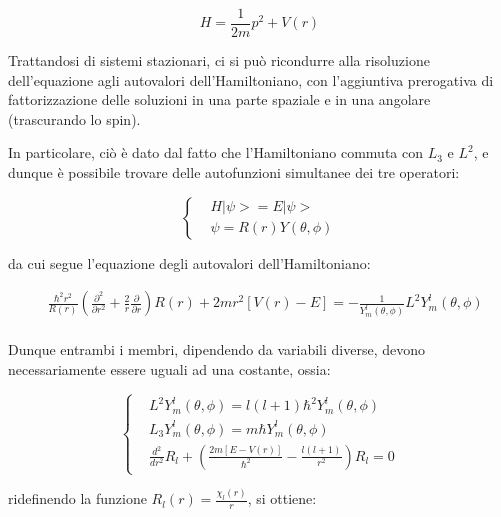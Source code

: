 \documentclass{article}
\begin{document}
\begin{equation}
    H=\frac{1}{2m}p^2+V(r)
\end{equation}

Trattandosi di sistemi stazionari, ci si può ricondurre alla risoluzione dell'equazione agli autovalori dell'Hamiltoniano,
con l'aggiuntiva prerogativa di fattorizzazione delle soluzioni in una parte spaziale e in una angolare (trascurando lo spin).

In particolare, ciò è dato dal fatto che l'Hamiltoniano commuta con $L_3$ e $L^2$, e dunque è possibile trovare delle autofunzioni simultanee dei tre operatori:

\begin{equation}
    \left\{
    \begin{aligned}
         & H|\psi>=E|\psi>           \\
         & \psi= R(r)Y(\theta, \phi)
    \end{aligned}
    \right.
\end{equation}

da cui segue l'equazione degli autovalori dell'Hamiltoniano:

\begin{equation}
    \begin{aligned}
         & \frac{\hbar^2r^2}{R(r)}\left(\frac{\partial^2}{\partial r^2}+\frac{2}{r}\frac{\partial}{\partial r}  \right)R(r)+2mr^2[V(r)-E] =-\frac{1}{Y^l_m(\theta,\phi)}L^2Y^l_m(\theta,\phi) \\
    \end{aligned}
\end{equation}

Dunque entrambi i membri, dipendendo da variabili diverse, devono necessariamente essere uguali ad una costante,
ossia:

\begin{equation}
    \left\{
    \begin{aligned}
         & L^2Y^l_m(\theta,\phi)=l(l+1)\hbar^2Y^l_m(\theta,\phi)                                 \\
         & L_3Y^l_m(\theta,\phi)=m\hbar Y^l_m(\theta,\phi)                                       \\
         & \frac{d^2}{dr^2}R_l + \left(\frac{2m[E-V(r)]}{\hbar^2}-\frac{l(l+1)}{r^2}\right)R_l=0
    \end{aligned}
    \right.
\end{equation}

ridefinendo la funzione $R_l(r)=\frac{\chi_l(r)}{r}$, si ottiene:
\end{document}

